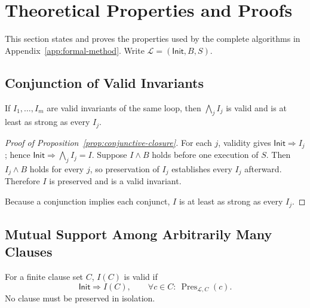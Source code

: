


\section{Theoretical Properties and Proofs}
\label{app:composition-proofs}

This section states and proves the properties used by the complete algorithms
in Appendix~\ref{app:formal-method}.  Write
\(\mathcal L=(\mathsf{Init},B,S)\).

\subsection{Conjunction of Valid Invariants}

\begin{proposition}
\label{prop:conjunctive-closure}
If \(I_1,\ldots,I_m\) are valid invariants of the same loop, then
\(\bigwedge_j I_j\) is valid and is at least as strong as every \(I_j\).
\end{proposition}

\begin{proof}[Proof of Proposition~\ref{prop:conjunctive-closure}]
For each \(j\), validity gives \(\mathsf{Init}\Rightarrow I_j\); hence
\(\mathsf{Init}\Rightarrow\bigwedge_j I_j=I\).  Suppose \(I\wedge B\) holds before one
execution of \(S\).  Then \(I_j\wedge B\) holds for every \(j\), so preservation
of \(I_j\) establishes every \(I_j\) afterward.  Therefore \(I\) is preserved
and is a valid invariant.

Because a conjunction implies each conjunct, \(I\) is at least as strong as
every \(I_j\).
\end{proof}

\subsection{Mutual Support Among Arbitrarily Many Clauses}

\begin{proposition}
\label{prop:mutual-support}
For a finite clause set \(C\), \(I(C)\) is valid if
\begin{equation}
  \mathsf{Init}\Rightarrow I(C),
  \qquad
  \forall c\in C:\ \operatorname{Pres}_{\mathcal L,C}(c).
  \label{eq:formal-mutual-support}
\end{equation}
No clause must be preserved in isolation.
\end{proposition}

